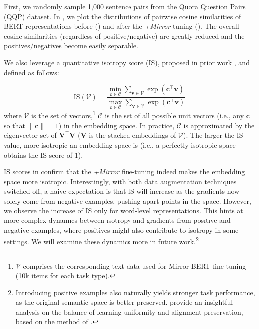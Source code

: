 \documentclass[11pt]{article}
\begin{document}
First, we randomly sample 1,000 sentence pairs from the Quora Question Pairs (QQP) dataset. In , we plot the distributions of pairwise cosine similarities of BERT representations before () and after the \textit{+Mirror} tuning (). The overall cosine similarities (regardless of positive/negative) are greatly reduced and the positives/negatives become easily separable. 



We also leverage a quantitative isotropy score (IS), proposed in prior work \citep{arora2016latent,mu2017all}, and defined as follows:

\vspace{-1.5mm}
{\footnotesize
\begin{equation}
  \text{IS} (\mathcal{V}) =  \frac{\min_{\mathbf{c}\in \mathcal{C}} \sum_{\mathbf{v}\in \mathcal{V}}\exp(\mathbf{c}^\top\mathbf{v})}{\max_{\mathbf{c}\in \mathcal{C}} \sum_{\mathbf{v}\in \mathcal{V}}\exp(\mathbf{c}^\top\mathbf{v})}
  \label{eq:isotropy_score}
\end{equation}
}where $\mathcal{V}$ is the set of vectors,\footnote{$\mathcal{V}$ comprises the corresponding text data used for Mirror-BERT fine-tuning (10k items for each task type).} $\mathcal{C}$ is the set of all possible unit vectors (i.e., any $\mathbf{c}$ so that $\|\mathbf{c}\|=1$) in the embedding space. In practice, $\mathcal{C}$ is approximated by the eigenvector set of $\mathbf{V}^\top\mathbf{V}$ ($\mathbf{V}$ is the stacked embeddings of $\mathcal{V}$). The larger the IS value, more isotropic an embedding space is (i.e., a perfectly isotropic space obtains the IS score of 1). 

IS scores in  confirm that the \textit{+Mirror} fine-tuning indeed makes the embedding space more isotropic. Interestingly, with both data augmentation techniques switched off, a naive expectation is that IS will increase as the gradients now solely come from negative examples, pushing apart points in the space. However, we observe the increase of IS only for word-level representations. This hints at more complex dynamics between isotropy and gradients from positive and negative examples, where positives might also contribute to isotropy in some settings. We will examine these dynamics more in future work.\footnote{Introducing positive examples also naturally yields stronger task performance, as the original semantic space is better preserved. \citet{gao2021simcse} provide an insightful analysis on the balance of learning uniformity and alignment preservation, based on the method of \citet{wang2020understanding}.}
\end{document}
